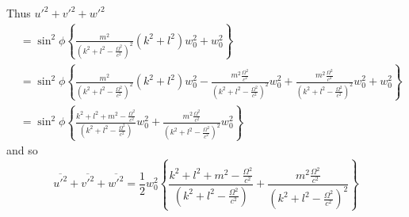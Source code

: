 \documentclass[12pt]{article}
\begin{document}
Thus $u'^2 + v'^2 + w'^2$
\begin{align}
&  = \sin^2\phi \left\{ \frac{m^2}{\left(k^2 + l^2 -\frac{\Omega ^2}{c^2}\right)^2} \left(k^2 + l^2\right)w_0^2 + w_0^2 \right\}  \\
&  = \sin^2\phi \left\{ \frac{m^2}{\left(k^2 + l^2 -\frac{\Omega^2}{c^2}\right)^2} \left(k^2 + l^2\right)w_0^2  - \frac{m^2 \frac{\Omega^2}{c^2}}{\left(k^2 + l^2 -\frac{\Omega^2}{c^2}\right)^2}w_0^2 + \frac{m^2 \frac{\Omega^2}{c^2}}{\left(k^2 + l^2 -\frac{\Omega^2}{c^2}\right)^2}w_0^2 + w_0^2 \right\} \\
&  = \sin^2\phi \left\{ \frac{k^2 + l^2  + m^2 -\frac{\Omega^2}{c^2}}{\left(k^2 + l^2 -\frac{\Omega^2}{c^2}\right)} w_0^2 + \frac{m^2 \frac{\Omega^2}{c^2}}{\left(k^2 + l^2 -\frac{\Omega^2}{c^2}\right)^2}w_0^2 \right\}
\end{align}
and so 
\begin{equation}
\overline{u'^2} + \overline{v'^2} + \overline{w'^2} = \frac{1}{2} w_0^2 \left\{ \frac{k^2 + l^2  + m^2 -\frac{\Omega^2}{c^2}}{\left(k^2 + l^2 -\frac{\Omega^2}{c^2}\right)} + \frac{m^2 \frac{\Omega^2}{c^2}}{\left(k^2 + l^2 -\frac{\Omega^2}{c^2}\right)^2} \right\}
\end{equation}
\end{document}
